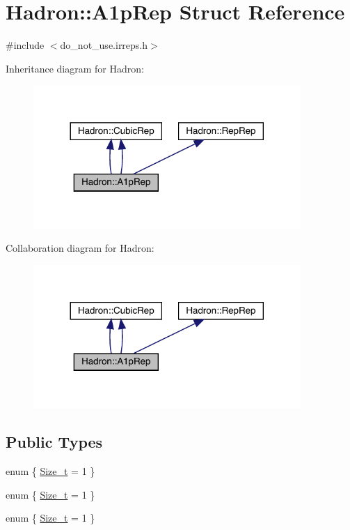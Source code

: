 \hypertarget{structHadron_1_1A1pRep}{}\section{Hadron\+:\+:A1p\+Rep Struct Reference}
\label{structHadron_1_1A1pRep}


{\ttfamily \#include $<$do\+\_\+not\+\_\+use.\+irreps.\+h$>$}



Inheritance diagram for Hadron\+:\nopagebreak
\begin{figure}[H]
\begin{center}
\leavevmode
\includegraphics[width=288pt]{d9/d9e/structHadron_1_1A1pRep__inherit__graph}
\end{center}
\end{figure}


Collaboration diagram for Hadron\+:\nopagebreak
\begin{figure}[H]
\begin{center}
\leavevmode
\includegraphics[width=288pt]{d7/dc8/structHadron_1_1A1pRep__coll__graph}
\end{center}
\end{figure}
\subsection*{Public Types}
\begin{DoxyCompactItemize}
\item 
enum \{ \mbox{\hyperlink{structHadron_1_1A1pRep_a27719f0ee2c616489d39c905c0733e1aa159086896626ac9045fc5cda95283a1a}{Size\+\_\+t}} = 1
 \}
\item 
enum \{ \mbox{\hyperlink{structHadron_1_1A1pRep_a27719f0ee2c616489d39c905c0733e1aa159086896626ac9045fc5cda95283a1a}{Size\+\_\+t}} = 1
 \}
\item 
enum \{ \mbox{\hyperlink{structHadron_1_1A1pRep_a27719f0ee2c616489d39c905c0733e1aa159086896626ac9045fc5cda95283a1a}{Size\+\_\+t}} = 1
 \}
\end{DoxyCompactItemize}
